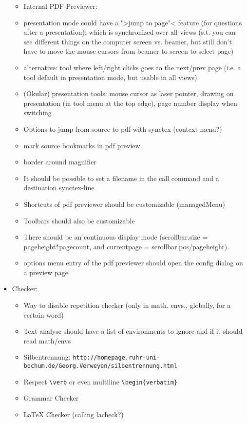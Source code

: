 \documentclass[10pt,a4paper,landscape]{report}
\begin{document}
\begin{itemize}
\begin{itemize}
	\item Internal PDF-Previewer:
	\item presentation mode could have a ">jump to page"< feature (for questions after a presentation); which is synchronized over all views (s.t. you can see different things on the computer screen vs. beamer, but still don't have to move the mouse cursors from beamer to screen to select page)
	\item alternative: tool where left/right clicks goes to the next/prev page (i.e. a tool default in presentation mode, but usable in all views)
	\item (Okular) presentation tools: mouse cursor as laser pointer, drawing on presentation (in tool menu at the top edge), page number display when switching
	\item Options to jump from source to pdf with synctex (context menu?)
	\item mark source bookmarks in pdf preview 
	\item border around magnifier
	\item It should be possible to set a filename in the call command and a destination synctex-line
	\item Shortcuts of pdf previewer should be customizable (managedMenu)
	\item Toolbars should also be customizable
	\item There should be an continuous display mode (scrollbar.size = pageheight*pagecount, and currentpage = scrollbar.pos/pageheight).
	\item options menu entry of the pdf previewer should open the config dialog on a preview page
	\end{itemize}
	\item  Checker: \begin{itemize}
		\item Way to disable repetition checker (only in math. envs., globally, for a certain word)
		\item Text analyse should have a list of environments to ignore and if it should read math/envs
		\item Silbentrennung: \verb+http://homepage.ruhr-uni-bochum.de/Georg.Verweyen/silbentrennung.html+
		\item Respect \verb+\verb+ or even multiline \verb+\begin{verbatim}+
		\item Grammar Checker
		\item LaTeX Checker	(calling lacheck?)
	\end{itemize}

\end{itemize}
\end{document}
